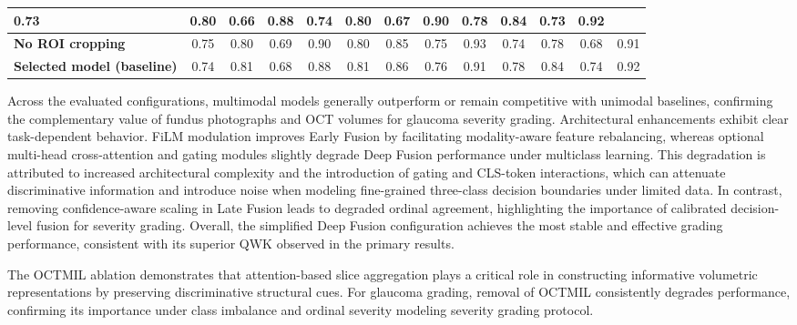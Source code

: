 \documentclass[preprint,12pt]{elsarticle}
\begin{document}
\begin{table}[!t]
\begin{tabular}{|l|cccc|cccc|cccc|}
        0.73                               & 0.80 & 0.66 & 0.88 &
        0.74                               & 0.80 & 0.67 & 0.90 &
        0.78                               & 0.84 & 0.73 & 0.92         \\
        \hline
        \textbf{No ROI cropping}           &
        0.75                               & 0.80 & 0.69 & 0.90 &
        0.80                               & 0.85 & 0.75 & 0.93 &
        0.74                               & 0.78 & 0.68 & 0.91         \\
        \hline
        \textbf{Selected model (baseline)} &
        0.74                               & 0.81 & 0.68 & 0.88 &
        0.81                               & 0.86 & 0.76 & 0.91 &
        0.78                               & 0.84 & 0.74 & 0.92         \\
        \hline
    \end{tabular}
\end{table}

Across the evaluated configurations, multimodal models generally outperform or remain competitive with unimodal baselines, confirming the complementary value of fundus photographs and OCT volumes for glaucoma severity grading. Architectural enhancements exhibit clear task-dependent behavior. FiLM modulation improves Early Fusion by facilitating modality-aware feature rebalancing, whereas optional multi-head cross-attention and gating modules slightly degrade Deep Fusion performance under multiclass learning. This degradation is attributed to increased architectural complexity and the introduction of gating and CLS-token interactions, which can attenuate discriminative information and introduce noise when modeling fine-grained three-class decision boundaries under limited data. In contrast, removing confidence-aware scaling in Late Fusion leads to degraded ordinal agreement, highlighting the importance of calibrated decision-level fusion for severity grading. Overall, the simplified Deep Fusion configuration achieves the most stable and effective grading performance, consistent with its superior QWK observed in the primary results.

The OCTMIL ablation demonstrates that attention-based slice aggregation plays a critical role in constructing informative volumetric representations by preserving discriminative structural cues. For glaucoma grading, removal of OCTMIL consistently degrades performance, confirming its importance under class imbalance and ordinal severity modeling severity grading protocol.
\end{document}

